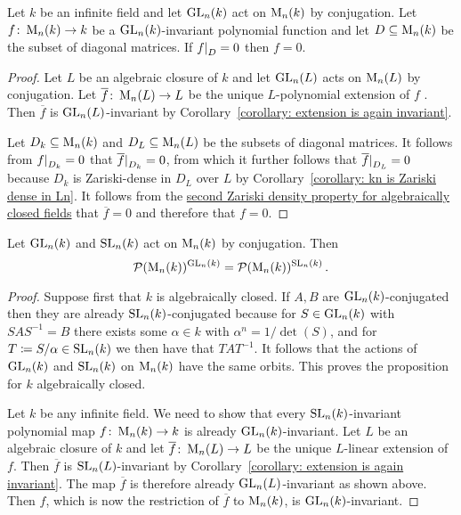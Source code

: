 \begin{proposition}
  Let $k$ be an infinite field and let $\operatorname{GL}_n(k)$ act on $\operatorname{M}_n(k)$ by conjugation.
  Let $f \colon \operatorname{M}_n(k) \to k$ be a $\operatorname{GL}_n(k)$-invariant polynomial function and let $D \subseteq \operatorname{M}_n(k)$ be the subset of diagonal matrices.
  If $\restrict{f}{D} = 0$ then $f = 0$.
\end{proposition}
\begin{proof}
  Let $L$ be an algebraic closure of $k$ and let $\operatorname{GL}_n(L)$ acts on $\operatorname{M}_n(L)$ by conjugation.
  Let $\overline{f} \colon \operatorname{M}_n(L) \to L$ be the unique $L$-polynomial extension of $f$ .
  Then $\overline{f}$ is $\operatorname{GL}_n(L)$-invariant by Corollary~\ref{corollary: extension is again invariant}.
  
  Let $D_k \subseteq \operatorname{M}_n(k)$ and $D_L \subseteq \operatorname{M}_n(L)$ be the subsets of diagonal matrices.
  It follows from $\restrict{f}{D_k} = 0$ that $\restrict{\overline{f}}{D_k} = 0$, from which it further follows that $\restrict{\overline{f}}{D_L} = 0$ because $D_k$ is Zariski-dense in $D_L$ over $L$ by Corollary~\ref{corollary: kn is Zariski dense in Ln}.
  It follows from the \hyperref[corollary: second Zariski density property for algebraically closed fields]{second Zariski density property for algebraically closed fields} that $\overline{f} = 0$ and therefore that $f = 0$.
\end{proof}


\begin{proposition}
  Let $\operatorname{GL}_n(k)$ and $\operatorname{SL}_n(k)$ act on $\operatorname{M}_n(k)$ by conjugation.
  Then
  \[
      \mathcal{P}(\operatorname{M}_n(k))^{\operatorname{GL}_n(k)}
    = \mathcal{P}(\operatorname{M}_n(k))^{\operatorname{SL}_n(k)} \,.
  \]
\end{proposition}


\begin{proof}
  Suppose first that $k$ is algebraically closed.
  If $A, B$ are $\operatorname{GL}_n(k)$-conjugated then they are already $\operatorname{SL}_n(k)$-conjugated because for $S \in \operatorname{GL}_n(k)$ with $S A S^{-1} = B$ there exists some $\alpha \in k$ with $\alpha^n = 1/\det(S)$, and for $T \coloneqq S/\alpha \in \operatorname{SL}_n(k)$ we then have that $T A T^{-1}$.
  It follows that the actions of $\operatorname{GL}_n(k)$ and $\operatorname{SL}_n(k)$ on $\operatorname{M}_n(k)$ have the same orbits.
  This proves the proposition for $k$ algebraically closed.
  
  Let $k$ be any infinite field.
  We need to show that every $\operatorname{SL}_n(k)$-invariant polynomial map $f \colon \operatorname{M}_n(k) \to k$ is already $\operatorname{GL}_n(k)$-invariant.
  Let $L$ be an algebraic closure of $k$ and let $\overline{f} \colon \operatorname{M}_n(L) \to L$ be the unique $L$-linear extension of $f$.
  Then $\overline{f}$ is $\operatorname{SL}_n(L)$-invariant by Corollary~\ref{corollary: extension is again invariant}.
  The map $\overline{f}$ is therefore already $\operatorname{GL}_n(L)$-invariant as shown above.
  Then $f$, which is now the restriction of $\overline{f}$ to $\operatorname{M}_n(k)$, is $\operatorname{GL}_n(k)$-invariant.
\end{proof}





